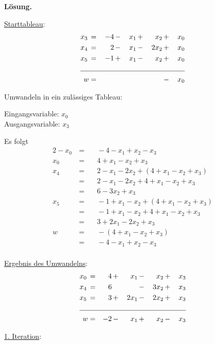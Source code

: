 \documentclass[10pt,a4paper,oneside,ngerman,numbers=noenddot]{scrartcl}
\begin{document}
		\textbf{Lösung.}
		
		\underline{Starttableau}:
		\begin{alignat*}{5}
			x_{3} \,&=&\, -4 \,&-&\, x_{1} \,&+&\, x_{2} \,&+&\, x_{0} \\
			x_{4} \,&=&\, 2 \,&-&\, x_{1} \,&-&\, 2x_{2} \,&+&\, x_{0} \\
			x_{5} \,&=&\, -1 \,&+&\, x_{1} \,&-&\, x_{2} \,&+&\, x_{0} \\ \cline{1 - 9}
			w &=& && && \,&-&\, x_{0}
		\end{alignat*}
		
		Umwandeln in ein zulässiges Tableau:
				
		Eingangsvariable: $x_{0}$\\
		Ausgangsvariable: $x_{3}$
		
		Es folgt
		\begin{alignat*}{2}
			-x_{0} \,&=&&\, -4 - x_{1} + x_{2} - x_{3} \\
			x_{0} \,&=&&\, 4 + x_{1} - x_{2} + x_{3} \\			
			x_{4} \,&=&&\, 2 - x_{1} - 2x_{2} + \left(4 + x_{1} - x_{2} + x_{3}\right) \\			
			&=&&\, 2 - x_{1} - 2x_{2} + 4 + x_{1} - x_{2} + x_{3} \\
			&=&&\, 6 - 3x_{2} + x_{3} \\
			x_{5} \,&=&&\, -1 + x_{1} - x_{2} + \left(4 + x_{1} - x_{2} + x_{3}\right) \\
			&=&&\, -1 + x_{1} - x_{2} + 4 + x_{1} - x_{2} + x_{3} \\
			&=&&\, 3 + 2x_{1} - 2x_{2} + x_{3} \\
			w \,&=&&\, -\left(4 + x_{1} - x_{2} + x_{3}\right) \\
			&=&&\, -4 - x_{1} + x_{2} - x_{3} \\
		\end{alignat*}
		
		\underline{Ergebnis des Umwandelns}:
		\begin{alignat*}{5}
			x_{0} \,&=&\, 4 \,&+&\, x_{1} \,&-&\, x_{2} \,&+&\, x_{3} \\
			x_{4} \,&=&\, 6 \,&& &-&\, 3x_{2} \,&+&\, x_{3} \\
			x_{5} \,&=&\, 3 \,&+&\, 2x_{1} \,&-&\, 2x_{2} \,&+&\, x_{3} \\ \cline{1 - 9}
			w &=& -2 \,&-&\, x_{1} \,&+&\, x_{2} \,&-&\, x_{3}
		\end{alignat*}
		
		\underline{1. Iteration}:
		
\end{document}
